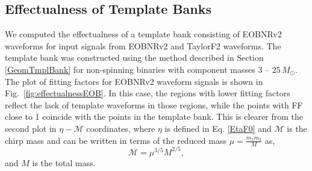 \documentclass{article}
\begin{document}
\subsection{Effectualness of Template Banks}

We computed the effectualness of a template bank consisting of EOBNRv2 waveforms for input signals from EOBNRv2 and TaylorF2 waveforms.
The template bank was constructed using the method described in Section \ref{GeomTmplBank} for non-spinning binaries with component masses $3$ -- $25\,M_{\odot}$. The plot of fitting factors for EOBNRv2 waveform signals is shown in Fig.~\ref{fig:effectualnessEOB}.
In this case, the regions with lower fitting factors reflect
the lack of template waveforms in those regions, while the points with
FF close to 1 coincide with the points in the template bank. This
is clearer from the second plot in $\eta-\mathcal{M}$ coordinates, where $\eta$ is defined in Eq. \ref{EtaF0} and $\mathcal{M}$ is the chirp mass and can be written in terms of the reduced mass $\mu = \frac{m_1 m_2}{M}$ as,
\begin{equation}
    \mathcal{M} = \mu^{3/5} M^{2/5},
\end{equation}
and $M$ is the total mass.
\end{document}
